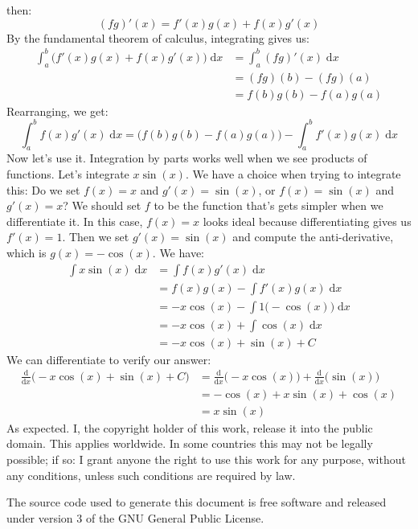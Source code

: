 \documentclass{article}
\theoremstyle{normal}
\theoremstyle{plain}
\begin{document}
    then:
    \begin{equation}
        (fg)'(x)=f'(x)g(x)+f(x)g'(x)
    \end{equation}
    By the fundamental theorem of calculus, integrating gives us:
    \begin{align}
        \int_{a}^{b}\Big(f'(x)g(x)+f(x)g'(x)\Big)\;\textrm{d}x
            &=\int_{a}^{b}(fg)'(x)\;\textrm{d}x\\
            &=(fg)(b)-(fg)(a)\\
            &=f(b)g(b)-f(a)g(a)
    \end{align}
    Rearranging, we get:
    \begin{equation}
        \int_{a}^{b}f(x)g'(x)\;\textrm{d}x
            =\Big(f(b)g(b)-f(a)g(a)\Big)-\int_{a}^{b}f'(x)g(x)\;\textrm{d}x
    \end{equation}
    Now let's use it. Integration by parts works well when we see products of
    functions. Let's integrate $x\sin(x)$. We have a choice when trying to
    integrate this: Do we set $f(x)=x$ and $g'(x)=\sin(x)$, or
    $f(x)=\sin(x)$ and $g'(x)=x$? We should set $f$ to be the function that's
    gets simpler when we differentiate it. In this case, $f(x)=x$ looks ideal
    because differentiating gives us $f'(x)=1$. Then we set $g'(x)=\sin(x)$ and
    compute the anti-derivative, which is $g(x)=-\cos(x)$. We have:
    \begin{align}
        \int{x}\sin(x)\;\textrm{d}x
            &=\int{f}(x)g'(x)\;\textrm{d}x\\
            &=f(x)g(x)-\int{f}'(x)g(x)\;\textrm{d}x\\
            &=-x\cos(x)-\int{1}\big(-\cos(x)\big)\;\textrm{d}x\\
            &=-x\cos(x)+\int\cos(x)\;\textrm{d}x\\
            &=-x\cos(x)+\sin(x)+C
    \end{align}
    We can differentiate to verify our answer:
    \begin{align}
        \frac{\textrm{d}}{\textrm{d}x}\Big(-x\cos(x)+\sin(x)+C\Big)
            &=\frac{\textrm{d}}{\textrm{d}x}\Big(-x\cos(x)\Big)
                +\frac{\textrm{d}}{\textrm{d}x}\Big(\sin(x)\Big)\\
            &=-\cos(x)+x\sin(x)+\cos(x)\\
            &=x\sin(x)
    \end{align}
    As expected.
    \newpage
    I, the copyright holder of this work, release it into the public domain.
    This applies worldwide. In some countries this may not be legally possible;
    if so: I grant anyone the right to use this work for any purpose, without
    any conditions, unless such conditions are required by law.
    \par\hfill\par
    The source code used to generate this document is free software and released
    under version 3 of the GNU General Public License.
\end{document}
